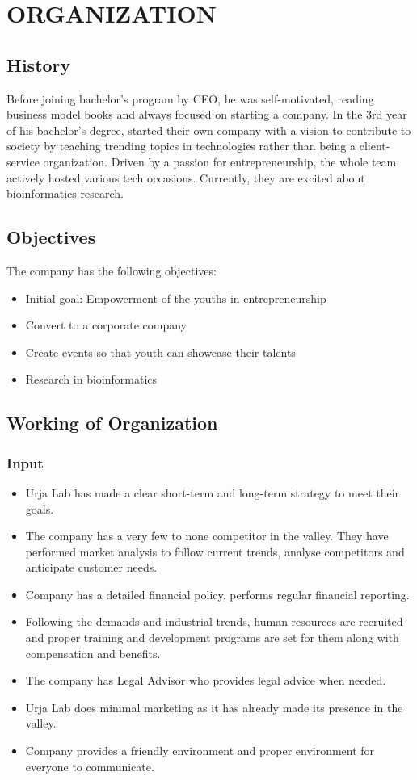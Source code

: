 
\chapter{ORGANIZATION}
      \section{History}
      Before joining bachelor's program by CEO, he was self-motivated, reading business model books and always focused on starting a company. In the 3rd year of his bachelor's degree, started their own company with a vision to contribute to society by teaching trending topics in technologies rather than being a client-service organization. Driven by a passion for entrepreneurship, the whole team actively hosted various tech occasions. Currently, they are excited about bioinformatics research.
      
      \section{Objectives}
      The company has the following objectives:
      \begin{itemize}
        \item Initial goal: Empowerment of the youths in entrepreneurship
        \item Convert to a corporate company
        \item Create events so that youth can showcase their talents
        \item Research in bioinformatics
      \end{itemize}

      \section{Working of Organization}
      \subsection{Input}
        \begin{itemize}
          \item Urja Lab has made a clear short-term and long-term strategy to meet their goals.
          \item The company has a very few to none competitor in the valley. They have performed market analysis to follow current trends, analyse competitors and anticipate customer needs.
          \item Company has a detailed financial policy, performs regular financial reporting. 
          \item Following the demands and industrial trends, human resources are recruited and proper training and development programs are set for them along with compensation and benefits.
          \item The company has Legal Advisor who provides legal advice when needed.
          \item Urja Lab does minimal marketing as it has already made its presence in the valley.
          \item Company provides a friendly environment and proper environment for everyone to communicate.
      \end{itemize}
